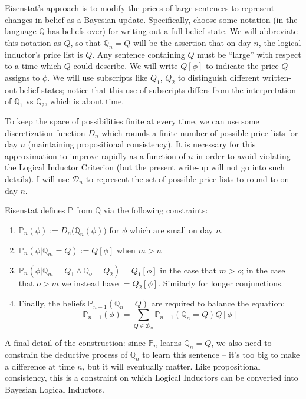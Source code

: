 \documentclass{article}
\begin{document}
Eisenstat's approach is to modify the prices of large sentences to represent changes in belief as a Bayesian update. Specifically, choose some notation (in the language $\mathbb{Q}$ has beliefs over) for writing out a full belief state. We will abbreviate this notation as $Q$, so that $\mathbb{Q}_n = Q$ will be the assertion that on day $n$, the logical inductor's price list is $Q$. Any sentence containing $Q$ must be ``large'' with respect to a time which $Q$ could describe. We will write $Q[\phi]$ to indicate the price $Q$ assigns to $\phi$. We will use subscripts like $Q_1$, $Q_2$ to distinguish different written-out belief states; notice that this use of subscripts differs from the interpretation of $\mathbb{Q}_1$ vs $\mathbb{Q}_2$, which is about time.

To keep the space of possibilities finite at every time, we can use some discretization function $D_{n}$ which rounds a finite number of possible price-lists for day $n$ (maintaining propositional consistency). It is necessary for this approximation to improve rapidly as a function of $n$ in order to avoid violating the Logical Inductor Criterion (but the present write-up will not go into such details). I will use $\mathcal{D}_{n}$ to represent the set of possible price-lists to round to on day $n$.

Eisenstat defines $\mathbb{P}$ from $\mathbb{Q}$ via the following constraints:
\begin{enumerate}
  \item $\mathbb{P}_n(\phi) := D_{n}\big(\mathbb{Q}_n(\phi)\big)$ for $\phi$ which are small on day $n$.
  \item $\mathbb{P}_n(\phi | \mathbb{Q}_m=Q) := Q[\phi]$ when $m>n$
  \item $\mathbb{P}_n(\phi|\mathbb{Q}_m=Q_1\wedge\mathbb{Q}_o=Q_2)= Q_1[\phi]$ in the case that $m>o$; in the case that $o>m$ we instead have $=Q_2[\phi]$. Similarly for longer conjunctions.
  \item Finally, the beliefs $\mathbb{P}_{n-1}(\mathbb{Q}_n=Q)$ are required to balance the equation:
  \[\mathbb{P}_{n-1}(\phi)=\sum_{Q\in\mathcal{D}_n} \mathbb{P}_{n-1}(\mathbb{Q}_n=Q)Q[\phi]\]
\end{enumerate}

A final detail of the construction: since $\mathbb{P}_n$ learns $\mathbb{Q}_n=Q$, we also need to constrain the deductive process of $\mathbb{Q}_n$ to learn this sentence -- it's too big to make a difference at time $n$, but it will eventually matter. Like propositional consistency, this is a constraint on which Logical Inductors can be converted into Bayesian Logical Inductors.
\end{document}
